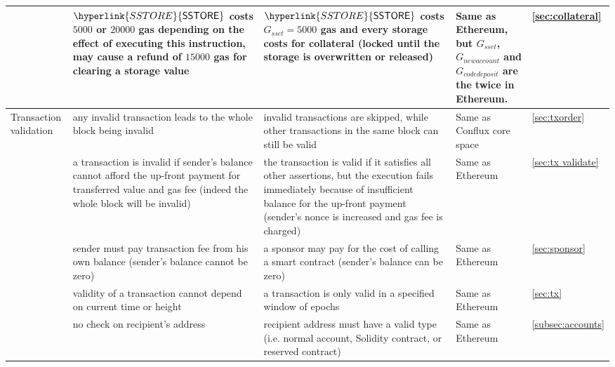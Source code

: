 \begin{center}
\begin{tabu}{X X X X l}
			& $\hyperlink{SSTORE}{\op{SSTORE}}$ costs $5000$ or $20000$ gas depending on the effect of executing this instruction, may cause a refund of $15000$ gas for clearing a storage value 
			& $\hyperlink{SSTORE}{\op{SSTORE}}$ costs \hyperlink{G__sset}{$G_{sset}$}$=5000$ gas and every \sunitsize storage costs \sunitprice for collateral (locked until the storage is overwritten or released)   
			& Same as Ethereum, but $G_{sset}$, $G_{newaccount}$ and $G_{codedeposit}$ are the twice in Ethereum.
			& \cref{sec:collateral}\\
			\hline
			Transaction validation & 
			{any invalid transaction leads to the whole block being invalid} & 
			{invalid transactions are skipped, while other transactions in the same block can still be valid} & Same as Conflux core space & \cref{sec:txorder}\smallskip\\
			& {a transaction is invalid if sender's balance cannot afford the up-front payment for transferred value and gas fee (indeed the whole block will be invalid)} & {the transaction is valid if it satisfies all other assertions, but the execution fails immediately because of insufficient balance for the up-front payment (sender's nonce is increased and gas fee is charged)}	& Same as Ethereum & \cref{sec:tx validate} \\
			& sender must pay transaction fee from his own balance (sender's balance cannot be zero)	& a sponsor may pay for the cost of calling a smart contract (sender's balance can be zero)	& Same as Ethereum & \cref{sec:sponsor} \\
			& validity of a transaction cannot depend on current time or height & a transaction is only valid in a specified window of epochs & Same as Ethereum & \cref{sec:tx} \\
			& no check on recipient's address & recipient address must have a valid type (i.e. normal account, Solidity contract, or reserved contract)  & Same as Ethereum & \cref{subsec:accounts} \\
		\bottomrule
	\end{tabu}
\end{center}
